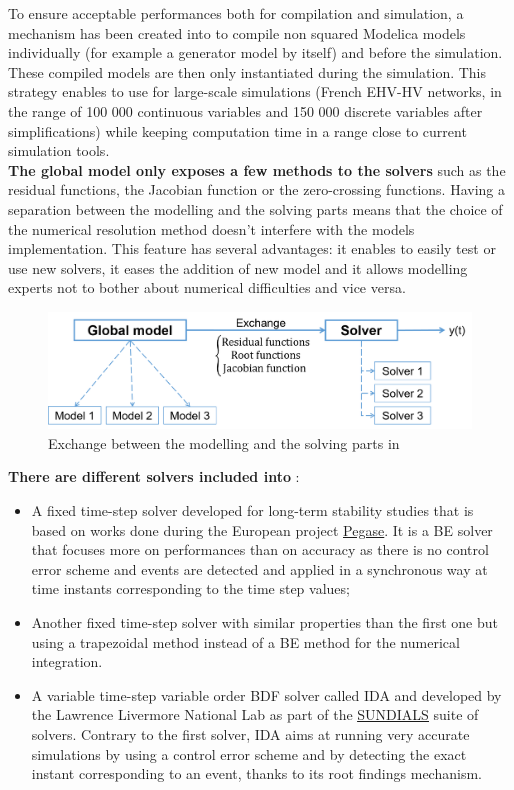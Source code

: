 \documentclass[a4paper, 12pt]{report}
\begin{document}
To ensure acceptable performances both for compilation and simulation, a mechanism has been created into \Dynawo to compile non squared Modelica models individually (for example a generator model by itself) and before the simulation. These compiled models are then only instantiated during the simulation. This strategy enables to use \Dynawo for large-scale simulations (French EHV-HV networks, in the range of 100 000 continuous variables and 150 000 discrete variables after simplifications) while keeping computation time in a range close to current simulation tools.\\

\textbf{The global model only exposes a few methods to the solvers} such as the residual functions, the Jacobian function or the zero-crossing functions. Having a separation between the modelling and the solving parts means that the choice of the numerical resolution method doesn't interfere with the models implementation. This feature has several advantages: it enables to easily test or use new solvers, it eases the addition of new model and it allows modelling experts not to bother about numerical difficulties and vice versa.

\begin{figure}[h!]
\centering
\includegraphics[width=\textwidth]{../resources/ExchangeModelSolver.png}
\caption{Exchange between the modelling and the solving parts in \Dynawo}
\end{figure}

\textbf{There are different solvers included into \Dynawo}:

\begin{itemize}
\item A fixed time-step solver developed for long-term stability studies that is based on works done during the European project \href{http://www.fp7-pegase.com/}{\underline{Pegase}}. It is a \ac{BE} solver that focuses more on performances than on accuracy as there is no control error scheme and events are detected and applied in a synchronous way at time instants corresponding to the time step values;
\item Another fixed time-step solver with similar properties than the first one but using a trapezoidal method instead of a \ac{BE} method for the numerical integration.
\item A variable time-step variable order BDF solver called IDA and developed by the Lawrence Livermore National Lab as part of the \href{https://computation.llnl.gov/projects/sundials}{\underline{SUNDIALS}} suite of solvers. Contrary to the first solver, IDA aims at running very accurate simulations by using a control error scheme and by detecting the exact instant corresponding to an event, thanks to its root findings mechanism.
\end{itemize}
\end{document}
